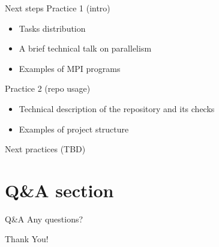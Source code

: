 \documentclass{beamer}
\begin{document}
\begin{frame}{Next steps}
    Practice 1 (intro)
    \begin{itemize}
        \item Tasks distribution
        \item A brief technical talk on parallelism
        \item Examples of MPI programs
    \end{itemize}
    Practice 2 (repo usage)
    \begin{itemize}
        \item Technical description of the repository and its checks
        \item Examples of project structure
    \end{itemize}
    Next practices (TBD)
\end{frame}

\section{Q\&A section}

\begin{frame}{Q\&A}
    \centering
    Any questions?
\end{frame}

\begin{frame}
    \centering
    \Huge{Thank You!}
\end{frame}
\end{document}
